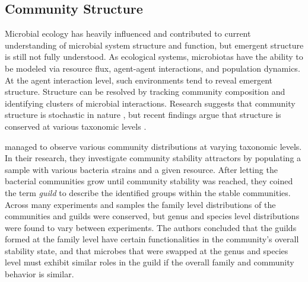 \subsection{Community Structure}\label{intro-com-struct}
Microbial ecology has heavily influenced and contributed to current understanding of microbial system structure and function, but emergent structure is still not fully understood. As ecological systems, microbiotas have the ability to be modeled via resource flux, agent-agent interactions, and population dynamics. At the agent interaction level, such environments tend to reveal emergent structure. Structure can be resolved by tracking community composition and identifying clusters of microbial interactions. Research suggests that community structure is stochastic in nature \citep{Robinson2010, Nemergut2013, Zhou2013}, but recent findings argue that structure is conserved at various taxonomic levels \citep{Goldford2018}. 

\citet{Goldford2018} managed to observe various community distributions at varying taxonomic levels. In their research, they investigate community stability attractors by populating a sample with various bacteria strains and a given resource. After letting the bacterial communities grow until community stability was reached, they coined the term \textit{guild} to describe the identified groups within the stable communities. Across many experiments and samples the family level distributions of the communities and guilds were conserved, but genus and species level distributions were found to vary between experiments. The authors concluded that the guilds formed at the family level have certain functionalities in the community's overall stability state, and that microbes that were swapped at the genus and species level must exhibit similar roles in the guild if the overall family and community behavior is similar.


